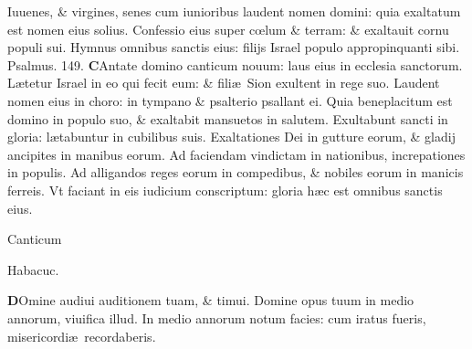 \documentclass[a5paper,10pt]{book}
\def\rightmarginnote{%
	\lrmarginnote{\hskip\columnwidth \hskip -1em}}
\def\ae{æ}
\def\oe{œ}
\begin{document}
\begin{multicols*}{2}
\newline \color{red} I\color{black}uuenes, \& virgines, senes cum iunioribus laudent nomen domini: quia exaltatum est nomen eius solius.
\newline \color{red} C\color{black}onfessio eius super c\oe lum \& terram: \& exaltauit cornu populi sui.
\newline \color{red} H\color{black}ymnus omnibus sanctis eius: filijs Israel populo appropinquanti sibi.
\newline \color{red} Psalmus. \hypertarget{ps149}{149.} \color{black}
\lettrine[lines=2]{\bfseries \color{red} C}{}Antate domino canticum nouum: laus eius in ecclesia sanctorum.
\newline \color{red} L\color{black}\ae tetur Israel in eo qui fecit eum: \& fili\ae \ Sion exultent in rege suo. %
\newline \color{red} L\color{black}audent nomen eius in choro: in tympano \& psalterio psallant ei.
\newline \color{red} Q\color{black}uia beneplacitum est domino in populo suo, \& exaltabit mansuetos in salutem.
\newline \color{red} E\color{black}xultabunt sancti in gloria: l\ae tabuntur in cubilibus suis.
\newline \color{red} E\color{black}xaltationes Dei in gutture eorum, \& gladij ancipites in manibus eorum.
\newline \color{red} A\color{black}d faciendam vindictam in nationibus, increpationes in populis.
\newline \color{red} A\color{black}d alligandos reges eorum in compedibus, \& nobiles eorum in manicis ferreis.
\newline \color{red} V\color{black}t faciant in eis iudicium conscriptum: gloria h\ae c est omnibus sanctis eius.
\vspace{-1em}
\begin{center} \color{red}
\hypertarget{Habakkuk}{Canticum} Habacuc.
\end{center}
\vspace{-1em}
\lettrine[lines=2]{\bfseries \color{red} D}{}Omine\rightmarginnote{Haba.\\3.} audiui auditionem tuam, \& timui.
\newline \color{red} D\color{black}omine opus tuum in medio annorum, viuifica illud.
\newline \color{red} I\color{black}n medio annorum notum facies: cum iratus fueris, misericordi\ae \ recordaberis.

\end{multicols*}
\end{document}

